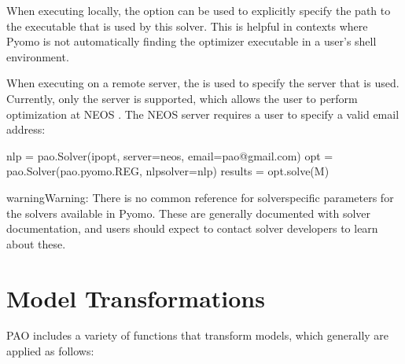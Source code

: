 \documentclass[letterpaper,10pt,english]{sphinxmanual}
\begin{document}
\begin{sphinxVerbatim}[commandchars=\\\{\}]
   
   
  
\end{sphinxVerbatim}

When executing locally, the  option can be used
to explicitly specify the path to the executable that is used by this solver.
This is helpful in contexts where Pyomo is not automatically finding the 
optimizer executable in a user’s shell environment.

When executing on a remote server, the  is used to
specify the server that is used.  Currently, only the  server is
supported, which allows the user to perform optimization at NEOS .
The NEOS server requires a user to specify a valid email address:

\begin{sphinxVerbatim}[commandchars=\\\{\}]
\PYGZgt{}\PYGZgt{}\PYGZgt{} nlp = pao.Solver(\PYGZsq{}ipopt\PYGZsq{}, server=\PYGZsq{}neos\PYGZsq{}, email=\PYGZsq{}pao@gmail.com\PYGZsq{})
\PYGZgt{}\PYGZgt{}\PYGZgt{} opt = pao.Solver(\PYGZsq{}pao.pyomo.REG\PYGZsq{}, nlp\PYGZus{}solver=nlp)
\PYGZgt{}\PYGZgt{}\PYGZgt{} results = opt.solve(M)
\end{sphinxVerbatim}

\begin{sphinxadmonition}{warning}{Warning:}
There is no common reference for solver\sphinxhyphen{}specific parameters for the
solvers available in Pyomo.  These are generally documented with
solver documentation, and users should expect to contact solver
developers to learn about these.
\end{sphinxadmonition}


\section{Model Transformations}
\label{\detokenize{xfrm:model-transformations}}\label{\detokenize{xfrm:transformations}}\label{\detokenize{xfrm::doc}}
PAO includes a variety of functions that transform models, which generally
are applied as follows:
\end{document}
